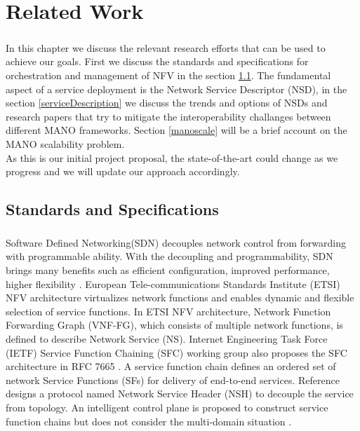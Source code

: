 \chapter{Related Work}
\label{ch:Related Work}

\paragraph{}
In this chapter we discuss the relevant research efforts that can be used to achieve our goals. First we discuss the standards and specifications for orchestration and management of NFV in the section \ref{standSpecs}. The fundamental aspect of a service deployment is the Network Service Descriptor (NSD), in the section \ref{serviceDescription} we discuss the trends and options of NSDs and research papers that try to mitigate the interoperability challanges between different MANO frameworks. Section \ref{manoscale} will be a brief account on the MANO scalability problem.\\

As this is our initial project proposal, the state-of-the-art could change as we progress and we will update our approach accordingly.


\section{Standards and Specifications}
\label{standSpecs}
\paragraph{}
Software Defined Networking(SDN) decouples network control from forwarding with programmable ability. With the decoupling and programmability, SDN brings many benefits such as efficient configuration, improved performance, higher flexibility \cite{xia2015survey}. European Tele-communications Standards Institute (ETSI) NFV \cite{nfv2network} architecture virtualizes network functions and enables dynamic and flexible selection of service functions. In ETSI NFV architecture, Network Function Forwarding Graph (VNF-FG), which consists of multiple network functions, is defined to describe Network Service (NS). Internet Engineering Task Force (IETF) Service Function Chaining (SFC) working group also proposes the SFC architecture in RFC 7665 \cite{halpern2015service}. A service function chain defines an ordered set of network Service Functions (SFs) for delivery of end-to-end services. Reference \cite{quinn2016network} designs a protocol named Network Service Header (NSH) to decouple the service from topology. An intelligent control plane is proposed to construct service function chains but does not consider the multi-domain situation \cite{boucadair2016service}.\\


